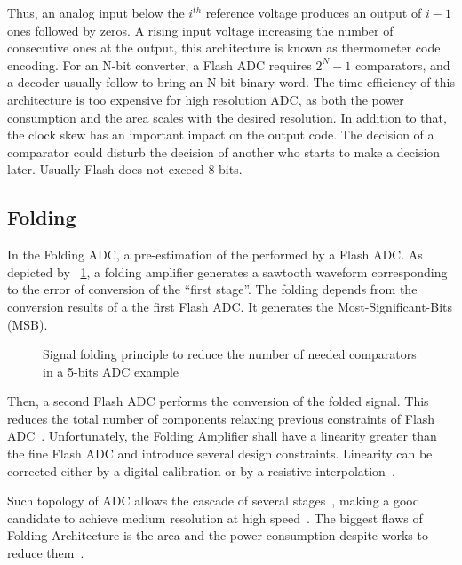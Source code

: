 Thus, an analog input below the \(i^{th} \) reference voltage produces an output of \(i-1 \) ones followed by zeros. A rising input voltage increasing the number of consecutive ones at the output, this architecture is known as thermometer code encoding. For an N-bit converter, a Flash ADC requires \(2^N-1\) comparators, and a decoder usually follow to bring an N-bit binary word. The time-efficiency of this architecture is too expensive for high resolution ADC, as both the power consumption and the area scales with the desired resolution. In addition to that, the clock skew has an important impact on the output code. The decision of a comparator could disturb the decision of another who starts to make a decision later. Usually Flash does not exceed 8-bits.

\subsection{Folding}                           %
\label{sec:folding-adc}
In the Folding ADC, a pre-estimation of the performed by a Flash ADC. As depicted by \figurename~\ref{fig:folding_principle}, a folding amplifier generates a sawtooth waveform corresponding to the error of conversion of the ``first stage''. The folding depends from the conversion results of a the first Flash ADC. It generates the Most-Significant-Bits (MSB).

\begin{figure}[htp]
	\centering
	\resizebox{0.8\textwidth}{!} {}
	\caption{Signal folding principle to reduce the number of needed comparators in a 5-bits ADC example}
	\label{fig:folding_principle}
\end{figure}

Then, a second Flash ADC performs the conversion of the folded signal. This reduces the total number of components relaxing previous constraints of Flash ADC~\cite{VanDePlassche1979, Grift1987, Nauta1995, Vorenkamp1997}. Unfortunately, the Folding Amplifier shall have a linearity greater than the fine Flash ADC and introduce several design constraints. Linearity can be corrected either by a digital calibration or by a resistive interpolation~\cite{Vorenkamp1997}.

Such topology of ADC allows the cascade of several stages~\cite{Taft2009, Buck2017}, making a good candidate to achieve medium resolution at high speed~\cite{Vorenkamp1997, Pan2000}. The biggest flaws of Folding Architecture is the area and the power consumption despite works to reduce them~\cite{Costa2013}.


